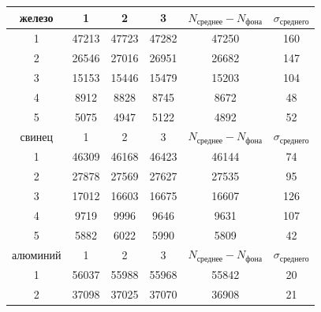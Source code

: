 \documentclass[a4paper, 14pt]{extarticle}%
\begin{document}
\begin{table}[h!]
\begin{center}
\begin{tabular}{|c|c|c|c|c|c|}
\hline
\rowcolor[HTML]{9698ED} 
железо   & 1     & 2     & 3     & $N_{\text{среднее}}-N_{\text{фона}}$ & $\sigma_{\text{среднего}}$ \\ \hline
1        & 47213 & 47723 & 47282 & 47250                                & 160                        \\ \hline
\rowcolor[HTML]{CBCEFB} 
2        & 26546 & 27016 & 26951 & 26682                                & 147                        \\ \hline
3        & 15153 & 15446 & 15479 & 15203                                & 104                        \\ \hline
\rowcolor[HTML]{CBCEFB} 
4        & 8912  & 8828  & 8745  & 8672                                 & 48                         \\ \hline
5        & 5075  & 4947  & 5122  & 4892                                 & 52                         \\ \hline
\rowcolor[HTML]{9698ED} 
свинец   & 1     & 2     & 3     & $N_{\text{среднее}}-N_{\text{фона}}$ & $\sigma_{\text{среднего}}$ \\ \hline
1        & 46309 & 46168 & 46423 & 46144                                & 74                         \\ \hline
\rowcolor[HTML]{CBCEFB} 
2        & 27878 & 27569 & 27627 & 27535                                & 95                         \\ \hline
3        & 17012 & 16603 & 16675 & 16607                                & 126                        \\ \hline
\rowcolor[HTML]{CBCEFB} 
4        & 9719  & 9996  & 9646  & 9631                                 & 107                        \\ \hline
5        & 5882  & 6022  & 5990  & 5809                                 & 42                         \\ \hline
\rowcolor[HTML]{9698ED} 
алюминий & 1     & 2     & 3     & $N_{\text{среднее}}-N_{\text{фона}}$ & $\sigma_{\text{среднего}}$ \\ \hline
1        & 56037 & 55988 & 55968 & 55842                                & 20                         \\ \hline
\rowcolor[HTML]{CBCEFB} 
2        & 37098 & 37025 & 37070 & 36908                                & 21                         \\ \hline

\end{tabular}
\end{center}
\end{table}
\end{document}
